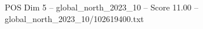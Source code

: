 \begin{textsample}{POS Dim 5 – global\_north\_2023\_10 – Score 11.00 – global\_north\_2023\_10/102619400.txt}
\end{textsample}
